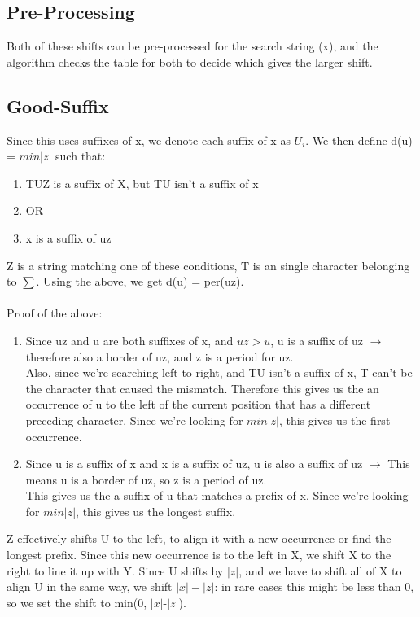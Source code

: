 \subsection{Pre-Processing}
Both of these shifts can be pre-processed for the search string (x), and the algorithm checks the table for both to decide which gives the larger shift. 

\subsection{Good-Suffix}
Since this uses suffixes of x, we denote each suffix of x as $U_i$. We then define d(u) = $min|z|$ such that:
\begin{enumerate}
    \item TUZ is a suffix of X, but TU isn't a suffix of x
    \item [] OR
    \item x is a suffix of uz
\end{enumerate}
Z is a string matching one of these conditions, T is an single character belonging to $\sum$. Using the above, we get d(u) = per(uz).\\ \\
Proof of the above:
\begin{enumerate}
    \item Since uz and u are both suffixes of x, and $uz > u$, u is a suffix of uz $\rightarrow$ therefore also a border of uz, and z is a period for uz. \\ Also, since we're searching left to right, and TU isn't a suffix of x, T can't be the character that caused the mismatch. Therefore this gives us the an occurrence of u to the left of the current position that has a different preceding character. Since we're looking for $min|z|$, this gives us the first occurrence.  
    \item Since u is a suffix of x and x is a suffix of uz, u is also a suffix of uz $\rightarrow$ This means u is a border of uz, so z is a period of uz. \\
    This gives us the a suffix of u that matches a prefix of x. Since we're looking for $min|z|$, this gives us the longest suffix.
\end{enumerate}
Z effectively shifts U to the left, to align it with a new occurrence or find the longest prefix. Since this new occurrence is to the left in X, we shift X to the right to line it up with Y. Since U shifts by $|z|$, and we have to shift all of X to align U in the same way, we shift $|x|-|z|$: in rare cases this might be less than 0, so we set the shift to min(0, $|x|$-$|z|$). \\

